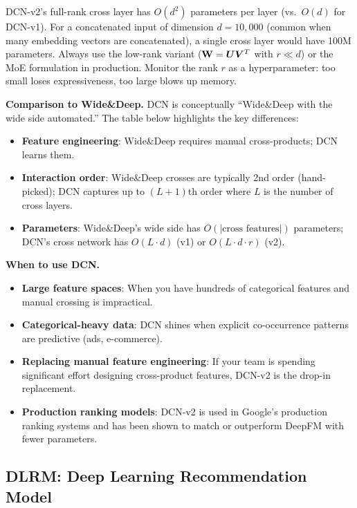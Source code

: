 \begin{warningbox}
DCN-v2's full-rank cross layer has $O(d^2)$ parameters per layer (vs.\ $O(d)$ for DCN-v1). For a concatenated input of dimension $d = 10{,}000$ (common when many embedding vectors are concatenated), a single cross layer would have 100M parameters. Always use the low-rank variant ($\mathbf{W} = \bm{U} \bm{V}^T$ with $r \ll d$) or the MoE formulation in production. Monitor the rank $r$ as a hyperparameter: too small loses expressiveness, too large blows up memory.
\end{warningbox}

\textbf{Comparison to Wide\&Deep.} DCN is conceptually ``Wide\&Deep with the wide side automated.'' The table below highlights the key differences:
\begin{itemize}
    \item \textbf{Feature engineering}: Wide\&Deep requires manual cross-products; DCN learns them.
    \item \textbf{Interaction order}: Wide\&Deep crosses are typically 2nd order (hand-picked); DCN captures up to $(L+1)$th order where $L$ is the number of cross layers.
    \item \textbf{Parameters}: Wide\&Deep's wide side has $O(|\text{cross features}|)$ parameters; DCN's cross network has $O(L \cdot d)$ (v1) or $O(L \cdot d \cdot r)$ (v2).
\end{itemize}

\textbf{When to use DCN.}
\begin{itemize}
    \item \textbf{Large feature spaces}: When you have hundreds of categorical features and manual crossing is impractical.
    \item \textbf{Categorical-heavy data}: DCN shines when explicit co-occurrence patterns are predictive (ads, e-commerce).
    \item \textbf{Replacing manual feature engineering}: If your team is spending significant effort designing cross-product features, DCN-v2 is the drop-in replacement.
    \item \textbf{Production ranking models}: DCN-v2 is used in Google's production ranking systems and has been shown to match or outperform DeepFM with fewer parameters.
\end{itemize}

\subsection{DLRM: Deep Learning Recommendation Model}
\label{sr:sec:dlrm}

